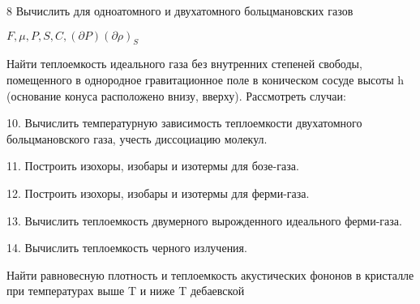 \documentclass[a4paper,12pt]{article} %
\begin{document}
\begin{task}

8 Вычислить для одноатомного и двухатомного больцмановских газов 

$ F, \mu, P, S, C,(\partial P)(\partial \rho)_{S}$




\end{task}


\begin{task}

Найти теплоемкость идеального газа без внутренних степеней свободы, помещенного в однородное гравитационное поле в коническом сосуде высоты h (основание конуса расположено внизу, вверху). Рассмотреть случаи:



\end{task}


\begin{task}

10. Вычислить температурную зависимость теплоемкости двухатомного больцмановского газа, учесть диссоциацию молекул. 


\end{task}


\begin{task}

11. Построить изохоры, изобары и изотермы для бозе-газа. 



\end{task}


\begin{task}

12. Построить изохоры, изобары и изотермы для ферми-газа. 


\end{task}


\begin{task}

13. Вычислить теплоемкость двумерного вырожденного идеального ферми-газа. 


\end{task}


\begin{task}

14. Вычислить теплоемкость черного излучения. 


\end{task}


\begin{task}

Найти равновесную плотность и теплоемкость акустических фононов в кристалле при температурах выше T  и ниже T  дебаевской


\end{task}
\end{document}
